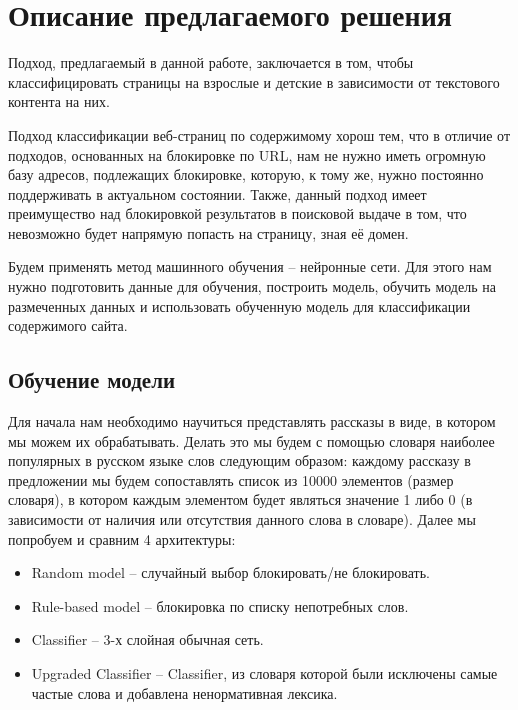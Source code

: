 \documentclass[14pt]{matmex-diploma}
\begin{document}
\section{Описание предлагаемого решения}

    Подход, предлагаемый в данной работе, заключается в том, чтобы классифицировать страницы на взрослые и детские в зависимости
    от текстового контента на них.
    
    Подход классификации веб-страниц по содержимому хорош тем, что в отличие от подходов, основанных на блокировке по URL,
    нам не нужно иметь огромную базу адресов, подлежащих блокировке, которую, к тому же, нужно постоянно поддерживать в актуальном
    состоянии. Также, данный подход имеет преимущество над блокировкой результатов в поисковой выдаче в том, что невозможно будет 
    напрямую попасть на страницу, зная её домен.
    
    Будем применять метод машинного обучения – нейронные сети. Для этого нам нужно
    подготовить данные для обучения, построить модель, обучить модель на размеченных данных и использовать 
    обученную модель для классификации содержимого сайта.
    
    \subsection{Обучение модели}
    
        Для начала нам необходимо научиться представлять рассказы в виде, в котором мы можем их обрабатывать.
        Делать это мы будем с помощью словаря наиболее популярных в русском языке слов следующим образом:
        каждому рассказу в предложении мы будем сопоставлять список из 10000 элементов (размер словаря), 
        в котором каждым элементом будет являться значение 1 либо 0 (в зависимости от наличия или отсутствия данного слова в словаре).
        Далее мы попробуем и сравним 4 архитектуры:
        
        \begin{itemize}
        	\item Random model – случайный выбор блокировать/не блокировать.
        	\item Rule-based model – блокировка по списку непотребных слов\cite{site:rule}.
        	\item Classifier – 3-х слойная обычная сеть.
        	\item Upgraded Classifier – Classifier, из словаря которой были исключены самые частые слова и добавлена ненормативная лексика.
        \end{itemize}
        
\end{document}
